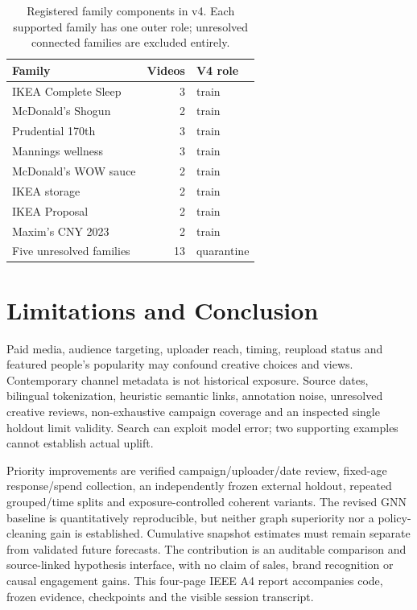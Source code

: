 \documentclass[a4paper,conference]{IEEEtran}
\begin{document}
\begin{table}[t]\caption{Registered family components in v4. Each supported family has one outer role; unresolved connected families are excluded entirely.}\label{tab:families}\centering\scriptsize\setlength{\tabcolsep}{5pt}
\begin{tabular}{lrl}\toprule Family & Videos & V4 role\\\midrule
IKEA Complete Sleep & 3 & train \\
McDonald's Shogun & 2 & train \\
Prudential 170th & 3 & train \\
Mannings wellness & 3 & train \\
McDonald's WOW sauce & 2 & train \\
IKEA storage & 2 & train \\
IKEA Proposal & 2 & train \\
Maxim's CNY 2023 & 2 & train \\
Five unresolved families & 13 & quarantine \\
\bottomrule\end{tabular}\end{table}

\section{Limitations and Conclusion}
Paid media, audience targeting, uploader reach, timing, reupload status and featured people's popularity may confound creative choices and views. Contemporary channel metadata is not historical exposure. Source dates, bilingual tokenization, heuristic semantic links, annotation noise, unresolved creative reviews, non-exhaustive campaign coverage and an inspected single holdout limit validity. Search can exploit model error; two supporting examples cannot establish actual uplift.

Priority improvements are verified campaign/uploader/date review, fixed-age response/spend collection, an independently frozen external holdout, repeated grouped/time splits and exposure-controlled coherent variants. The revised GNN baseline is quantitatively reproducible, but neither graph superiority nor a policy-cleaning gain is established. Cumulative snapshot estimates must remain separate from validated future forecasts. The contribution is an auditable comparison and source-linked hypothesis interface, with no claim of sales, brand recognition or causal engagement gains. This four-page IEEE A4 report \cite{ieee} accompanies code, frozen evidence, checkpoints and the visible session transcript.
\end{document}
